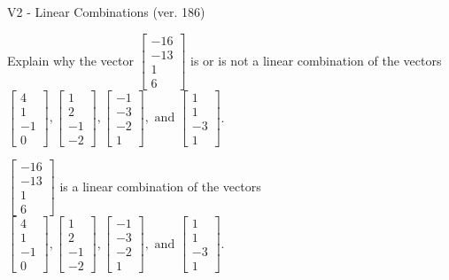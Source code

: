 \begin{exercise}
  \begin{exerciseTitle}V2 - Linear Combinations (ver. 186)\end{exerciseTitle}
  \begin{exerciseStatement}
    Explain why the vector \(\left[\begin{array}{c}
-16 \\
-13 \\
1 \\
6
\end{array}\right]\)  is or is not a linear 
	combination of the vectors \(\left[\begin{array}{c}
4 \\
1 \\
-1 \\
0
\end{array}\right] , \left[\begin{array}{c}
1 \\
2 \\
-1 \\
-2
\end{array}\right] , \left[\begin{array}{c}
-1 \\
-3 \\
-2 \\
1
\end{array}\right] , \text{ and } \left[\begin{array}{c}
1 \\
1 \\
-3 \\
1
\end{array}\right]\).
	


  \end{exerciseStatement}
  \begin{exerciseAnswer}
   \(\left[\begin{array}{c}
-16 \\
-13 \\
1 \\
6
\end{array}\right]\) 
  	 is  
	a linear combination of the vectors \(\left[\begin{array}{c}
4 \\
1 \\
-1 \\
0
\end{array}\right] , \left[\begin{array}{c}
1 \\
2 \\
-1 \\
-2
\end{array}\right] , \left[\begin{array}{c}
-1 \\
-3 \\
-2 \\
1
\end{array}\right] , \text{ and } \left[\begin{array}{c}
1 \\
1 \\
-3 \\
1
\end{array}\right]\).


\end{exerciseAnswer}
\end{exercise}
